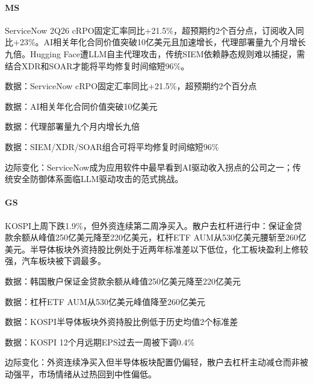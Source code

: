 \documentclass[11pt]{ctexart}
\begin{document}
\paragraph{MS} ServiceNow 2Q26 cRPO固定汇率同比+21.5\%，超预期约2个百分点，订阅收入同比+23\%。AI相关年化合同价值突破10亿美元且加速增长，代理部署量九个月增长九倍。Hugging Face遭LLM自主代理攻击，传统SIEM依赖静态规则难以捕捉，需结合XDR和SOAR才能将平均修复时间缩短96\%。
{\small\color{refgray}数据：ServiceNow cRPO固定汇率同比+21.5\%，超预期约2个百分点\par}
{\small\color{refgray}数据：AI相关年化合同价值突破10亿美元\par}
{\small\color{refgray}数据：代理部署量九个月内增长九倍\par}
{\small\color{refgray}数据：SIEM/XDR/SOAR组合可将平均修复时间缩短96\%\par}
{\small\color{refgray}边际变化：ServiceNow成为应用软件中最早看到AI驱动收入拐点的公司之一；传统安全防御体系面临LLM驱动攻击的范式挑战。\par}
\paragraph{GS} KOSPI上周下跌1.9\%，但外资连续第二周净买入。散户去杠杆进行中：保证金贷款余额从峰值250亿美元降至220亿美元，杠杆ETF AUM从530亿美元腰斩至260亿美元。半导体板块外资持股比例处于近两年标准差以下低位，化工板块盈利上修较强，汽车板块被下调最多。
{\small\color{refgray}数据：韩国散户保证金贷款余额从峰值250亿美元降至220亿美元\par}
{\small\color{refgray}数据：杠杆ETF AUM从530亿美元峰值降至260亿美元\par}
{\small\color{refgray}数据：KOSPI半导体板块外资持股比例低于历史均值2个标准差\par}
{\small\color{refgray}数据：KOSPI 12个月远期EPS过去一周被下调0.4\%\par}
{\small\color{refgray}边际变化：外资连续净买入但半导体板块配置仍偏轻，散户去杠杆主动减仓而非被动强平，市场情绪从过热回到中性偏低。\par}
\end{document}
